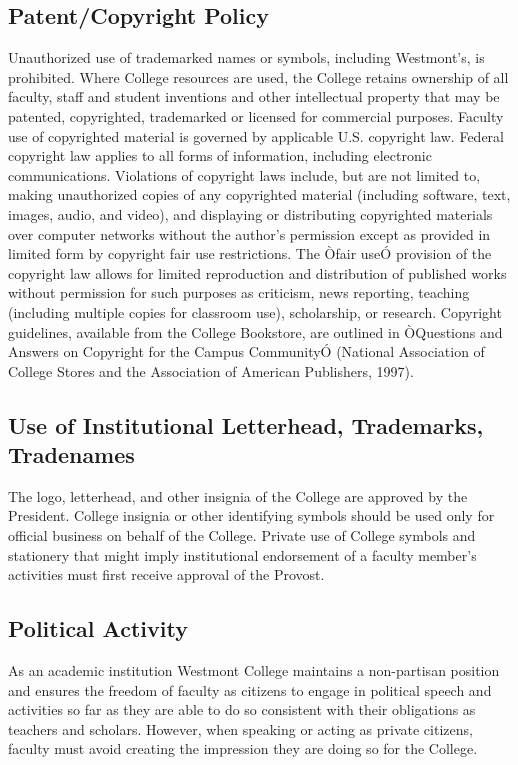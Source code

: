 \documentclass[letterpaper, 11pt]{article}
\begin{document}
	\subsection{Patent/Copyright Policy}
		Unauthorized use of trademarked names or symbols, including Westmont's, is prohibited.  Where College resources are used, the College retains ownership of all faculty, staff and student inventions and other intellectual property that may be patented, copyrighted, trademarked or licensed for commercial purposes.
		Faculty use of copyrighted material is governed by applicable U.S. copyright law.  Federal copyright law applies to all forms of information, including electronic communications.  Violations of copyright laws include, but are not limited to, making unauthorized copies of any copyrighted material (including software, text, images, audio, and video), and displaying or distributing copyrighted materials over computer networks without the author's permission except as provided in limited form by copyright fair use restrictions.  The Òfair useÓ provision of the copyright law allows for limited reproduction and distribution of published works without permission for such purposes as criticism, news reporting, teaching (including multiple copies for classroom use), scholarship, or research.  Copyright guidelines, available from the College Bookstore, are outlined in ÒQuestions and Answers on Copyright for the Campus CommunityÓ (National Association of College Stores and the Association of American Publishers, 1997).
	\subsection{Use of Institutional Letterhead, Trademarks, Tradenames}
		The logo, letterhead, and other insignia of the College are approved by the President.  College insignia or other identifying symbols should be used only for official business on behalf of the College.  Private use of College symbols and stationery that might imply institutional endorsement of a faculty member's activities must first receive approval of the Provost.
	\subsection{Political Activity}
		As an academic institution Westmont College maintains a non-partisan position and ensures the freedom of faculty as citizens to engage in political speech and activities so far as they are able to do so consistent with their obligations as teachers and scholars.  However, when speaking or acting as private citizens, faculty must avoid creating the impression they are doing so for the College.
\end{document}
